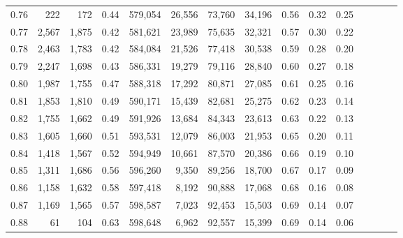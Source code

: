 \begin{tabular}{rrrcrrrrrrrrrrr}
0.76 &     222 &    172 &                                       0.44 &  579,054 &   26,556 &   73,760 &   34,196 &  0.56 &  0.32 &                         0.25 \\
0.77 &   2,567 &  1,875 &                                       0.42 &  581,621 &   23,989 &   75,635 &   32,321 &  0.57 &  0.30 &                         0.22 \\
0.78 &   2,463 &  1,783 &                                       0.42 &  584,084 &   21,526 &   77,418 &   30,538 &  0.59 &  0.28 &                         0.20 \\
0.79 &   2,247 &  1,698 &                                       0.43 &  586,331 &   19,279 &   79,116 &   28,840 &  0.60 &  0.27 &                         0.18 \\
0.80 &   1,987 &  1,755 &                                       0.47 &  588,318 &   17,292 &   80,871 &   27,085 &  0.61 &  0.25 &                         0.16 \\
0.81 &   1,853 &  1,810 &                                       0.49 &  590,171 &   15,439 &   82,681 &   25,275 &  0.62 &  0.23 &                         0.14 \\
0.82 &   1,755 &  1,662 &                                       0.49 &  591,926 &   13,684 &   84,343 &   23,613 &  0.63 &  0.22 &                         0.13 \\
0.83 &   1,605 &  1,660 &                                       0.51 &  593,531 &   12,079 &   86,003 &   21,953 &  0.65 &  0.20 &                         0.11 \\
0.84 &   1,418 &  1,567 &                                       0.52 &  594,949 &   10,661 &   87,570 &   20,386 &  0.66 &  0.19 &                         0.10 \\
0.85 &   1,311 &  1,686 &                                       0.56 &  596,260 &    9,350 &   89,256 &   18,700 &  0.67 &  0.17 &                         0.09 \\
0.86 &   1,158 &  1,632 &                                       0.58 &  597,418 &    8,192 &   90,888 &   17,068 &  0.68 &  0.16 &                         0.08 \\
0.87 &   1,169 &  1,565 &                                       0.57 &  598,587 &    7,023 &   92,453 &   15,503 &  0.69 &  0.14 &                         0.07 \\
0.88 &      61 &    104 &                                       0.63 &  598,648 &    6,962 &   92,557 &   15,399 &  0.69 &  0.14 &                         0.06 \\

\end{tabular}
